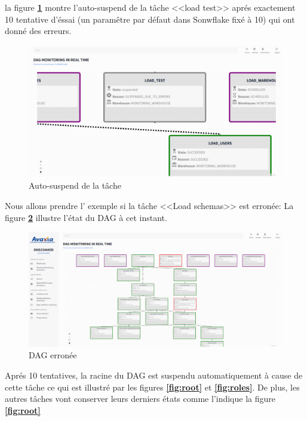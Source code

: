 \par la figure \textbf{\ref{fig:autosus}} montre l'auto-suspend de la tâche <<load test>> aprés exactement 10 tentative d'éssai (un paramêtre par défaut dans Sonwflake fixé à 10) qui ont donné des erreurs.
\begin{figure}[H]
    \centering
    \includegraphics[width =1\linewidth]{img/captures/dag/final/error.png}
    \caption{Auto-suspend de la tâche}
    \label{fig:autosus}
    \end{figure}
\par Nous allons prendre l' exemple si la tâche <<Load schemas>> est erronée:  La figure \textbf{\ref{fig:dagerror}} illustre l'état du DAG à cet instant. 
\begin{figure}[H]
    \centering
    \includegraphics[width =1\linewidth]{img/captures/dag/final/schemaerror.png}
    \caption{DAG erronée}
    \label{fig:dagerror}
    \end{figure}
\par Aprés 10 tentatives, la racine du DAG est suspendu automatiquement à cause de cette tâche ce qui est illustré par les figures \textbf{\ref{fig:root}} et \textbf{\ref{fig:roles}}. De plus, les autres tâches vont conserver leurs derniers états comme l'indique la figure \textbf{\ref{fig:root}}
